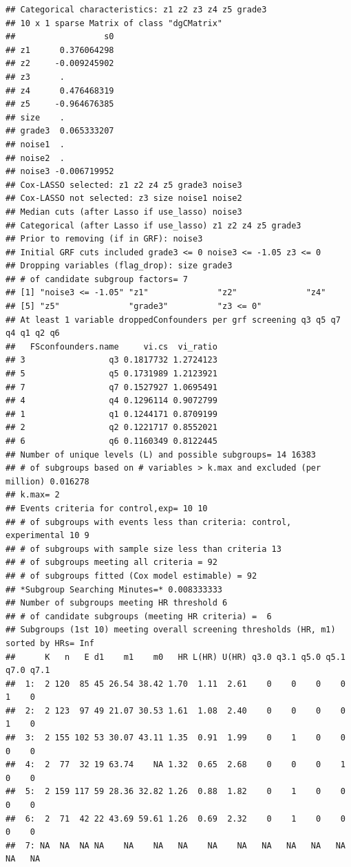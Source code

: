 \documentclass[smallextended]{svjour3}
\makeatletter
\newenvironment{kframe}{%
 \def\at@end@of@kframe{}%
 \ifinner\ifhmode%
  \def\at@end@of@kframe{\end{minipage}}%
  \begin{minipage}{\columnwidth}%
 \fi\fi%
 \def\FrameCommand##1{\hskip\@totalleftmargin \hskip-\fboxsep
 \colorbox{shadecolor}{##1}\hskip-\fboxsep
     \hskip-\linewidth \hskip-\@totalleftmargin \hskip\columnwidth}%
 \MakeFramed {\advance\hsize-\width
   \@totalleftmargin\z@ \linewidth\hsize
   \@setminipage}}%
 {\par\unskip\endMakeFramed%
 \at@end@of@kframe}
\newenvironment{knitrout}{}{} %
\makeatother
\begin{document}
\begin{knitrout}
\begin{kframe}
\begin{verbatim}
## Categorical characteristics: z1 z2 z3 z4 z5 grade3 
## 10 x 1 sparse Matrix of class "dgCMatrix"
##                  s0
## z1      0.376064298
## z2     -0.009245902
## z3      .          
## z4      0.476468319
## z5     -0.964676385
## size    .          
## grade3  0.065333207
## noise1  .          
## noise2  .          
## noise3 -0.006719952
## Cox-LASSO selected: z1 z2 z4 z5 grade3 noise3 
## Cox-LASSO not selected: z3 size noise1 noise2 
## Median cuts (after Lasso if use_lasso) noise3 
## Categorical (after Lasso if use_lasso) z1 z2 z4 z5 grade3 
## Prior to removing (if in GRF): noise3 
## Initial GRF cuts included grade3 <= 0 noise3 <= -1.05 z3 <= 0 
## Dropping variables (flag_drop): size grade3 
## # of candidate subgroup factors= 7 
## [1] "noise3 <= -1.05" "z1"              "z2"              "z4"             
## [5] "z5"              "grade3"          "z3 <= 0"        
## At least 1 variable droppedConfounders per grf screening q3 q5 q7 q4 q1 q2 q6 
##   FSconfounders.name     vi.cs  vi_ratio
## 3                 q3 0.1817732 1.2724123
## 5                 q5 0.1731989 1.2123921
## 7                 q7 0.1527927 1.0695491
## 4                 q4 0.1296114 0.9072799
## 1                 q1 0.1244171 0.8709199
## 2                 q2 0.1221717 0.8552021
## 6                 q6 0.1160349 0.8122445
## Number of unique levels (L) and possible subgroups= 14 16383 
## # of subgroups based on # variables > k.max and excluded (per million) 0.016278 
## k.max= 2 
## Events criteria for control,exp= 10 10 
## # of subgroups with events less than criteria: control, experimental 10 9 
## # of subgroups with sample size less than criteria 13 
## # of subgroups meeting all criteria = 92 
## # of subgroups fitted (Cox model estimable) = 92 
## *Subgroup Searching Minutes=* 0.008333333 
## Number of subgroups meeting HR threshold 6 
## # of candidate subgroups (meeting HR criteria) =  6 
## Subgroups (1st 10) meeting overall screening thresholds (HR, m1) sorted by HRs= Inf 
##      K   n   E d1    m1    m0   HR L(HR) U(HR) q3.0 q3.1 q5.0 q5.1 q7.0 q7.1
##  1:  2 120  85 45 26.54 38.42 1.70  1.11  2.61    0    0    0    0    1    0
##  2:  2 123  97 49 21.07 30.53 1.61  1.08  2.40    0    0    0    0    1    0
##  3:  2 155 102 53 30.07 43.11 1.35  0.91  1.99    0    1    0    0    0    0
##  4:  2  77  32 19 63.74    NA 1.32  0.65  2.68    0    0    0    1    0    0
##  5:  2 159 117 59 28.36 32.82 1.26  0.88  1.82    0    1    0    0    0    0
##  6:  2  71  42 22 43.69 59.61 1.26  0.69  2.32    0    1    0    0    0    0
##  7: NA  NA  NA NA    NA    NA   NA    NA    NA   NA   NA   NA   NA   NA   NA

\end{verbatim}
\end{kframe}
\end{knitrout}
\end{document}
